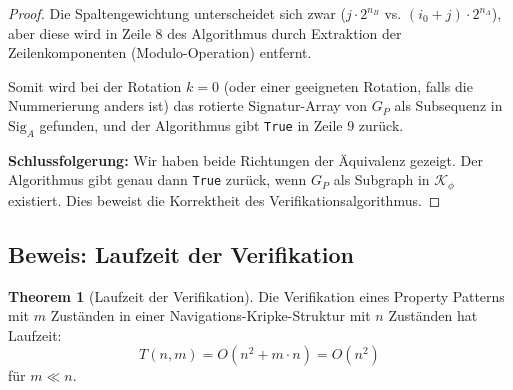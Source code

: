 ﻿\documentclass[a4paper,12pt]{article}
\theoremstyle{definition}
\newtheorem{theorem}{Theorem}[section]
\begin{document}
\begin{proof}
Die Spaltengewichtung unterscheidet sich zwar ($j \cdot 2^{n_B}$ vs. $(i_0+j) \cdot 2^{n_A}$), aber diese wird in Zeile 8 des Algorithmus durch Extraktion der Zeilenkomponenten (Modulo-Operation) entfernt.

Somit wird bei der Rotation $k=0$ (oder einer geeigneten Rotation, falls die Nummerierung anders ist) das rotierte Signatur-Array von $G_P$ als Subsequenz in $\text{Sig}_A$ gefunden, und der Algorithmus gibt \texttt{True} in Zeile 9 zurück.

\textbf{Schlussfolgerung:} Wir haben beide Richtungen der Äquivalenz gezeigt. Der Algorithmus gibt genau dann \texttt{True} zurück, wenn $G_P$ als Subgraph in $\mathcal{K}_{\phi}$ existiert. Dies beweist die Korrektheit des Verifikationsalgorithmus.
\end{proof}

\subsection{Beweis: Laufzeit der Verifikation}

\begin{theorem}[Laufzeit der Verifikation]
Die Verifikation eines Property Patterns mit $m$ Zuständen in einer Navigations-Kripke-Struktur mit $n$ Zuständen hat Laufzeit:
\[
T(n,m) = O(n^2 + m \cdot n) = O(n^2)
\]
für $m \ll n$.
\end{theorem}
\end{document}
